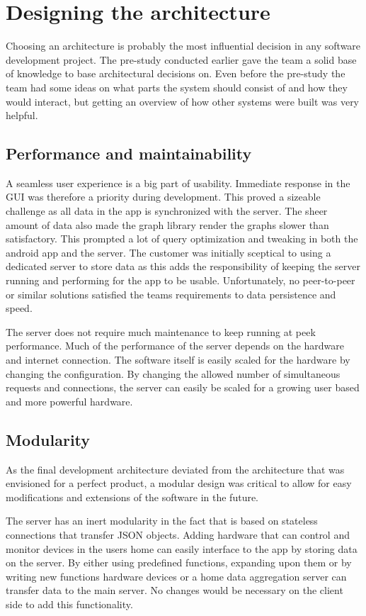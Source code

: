 \section{Designing the architecture}
Choosing an architecture is probably the most influential decision in any software development project. The pre-study conducted earlier gave the team a solid base of knowledge to base architectural  decisions on. Even before the pre-study the team had some ideas on what parts the system should consist of and how they would interact, but getting an overview of how other systems were built was very helpful. 

\subsection{Performance and maintainability}
A seamless user experience is a big part of usability. Immediate response in the GUI was therefore a priority during development. This proved a sizeable challenge as all data in the app is synchronized with the server. The sheer amount of data also made the graph library render the graphs slower than satisfactory. This prompted a lot of query optimization and tweaking in both the android app and the server. The customer was initially sceptical to using a dedicated server to store data as this adds the responsibility of keeping the server running and performing for the app to be usable. Unfortunately, no peer-to-peer or similar solutions satisfied the teams requirements to data persistence and speed.

The server does not require much maintenance to keep running at peek performance. Much of the performance of the server depends on the hardware and internet connection. The software itself is easily scaled for the hardware by changing the configuration. By changing the allowed number of simultaneous requests and connections, the server can easily be scaled for a growing user based and more powerful hardware.

\subsection{Modularity}
As the final development architecture deviated from the architecture that was envisioned for a perfect product, a modular design was critical to allow for easy modifications and extensions of the software in the future. 

The server has an inert  modularity in the fact that is based on stateless connections that transfer JSON objects. Adding hardware that can control and monitor devices in the users home can easily interface to the app by storing data on the server. By either using predefined functions, expanding upon them or by writing new functions hardware devices or a home data aggregation server can transfer data to the main server. No changes would be necessary on the client side to add this functionality.